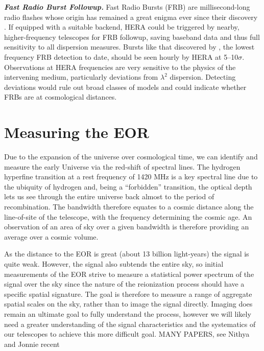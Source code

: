 \documentclass[preprint,11pt]{aastex}
\begin{document}
\textbf{\emph{Fast Radio Burst Followup.}}
\label{sec:FRBs}
Fast Radio Bursts (FRB) are millisecond-long radio flashes whose origin has remained a great enigma ever since their discovery \citep{2007Sci...318..777L}. 
If equipped with a suitable backend, HERA could be triggered by nearby, higher-frequency telescopes for FRB followup, saving baseband data and thus full sensitivity to all dispersion measures.
Bursts like that discovered by \citet{masui_et_al2015}, the lowest frequency
FRB detection to date, should be seen hourly by HERA at 5--10$\sigma$. %
 Observations at HERA frequencies are very sensitive to the physics of
the intervening medium, particularly deviations from $\lambda^2$
dispersion. Detecting deviations would rule out broad classes of models and could indicate whether FRBs are at cosmological distances.

\section{Measuring the EOR}
\label{sec:eormeas}
Due to the expansion of the universe over cosmological time, we can identify and measure the early Universe via the red-shift of spectral lines.  The hydrogen hyperfine transition at a rest frequency of 1420 MHz is a key spectral line due to the ubiquity of hydrogen and, being a ``forbidden'' transition, the optical depth lets us see through the entire universe back almost to the period of recombination.  The bandwidth
therefore equates to a cosmic distance along the line-of-site of the telescope, with the frequency determining the cosmic age.  An observation of an area of sky over a given bandwidth is therefore providing an average
over a cosmic volume.

As the distance to the EOR is great (about 13 billion light-years) the signal is quite weak.  However, the signal also subtends the entire sky, so initial measurements of the EOR strive to measure a statistical power spectrum of the signal over the sky since the nature of the reionization process should have a specific spatial signature.  The goal is therefore to measure a range of aggregate spatial scales on the sky, rather than to image the signal directly.  Imaging does remain an ultimate goal to fully understand the process, however we will likely need a greater understanding of the signal characteristics and the systematics of our telescopes to achieve this more difficult goal.  MANY PAPERS, see Nithya and Jonnie recent
\end{document}
